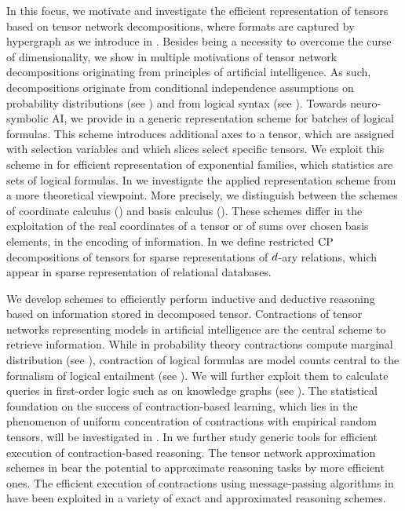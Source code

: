 \subsect{\focusonespec}
In this focus, we motivate and investigate the efficient representation of tensors based on tensor network decompositions, where formats are captured by hypergraph as we introduce in .
Besides being a necessity to overcome the curse of dimensionality, we show in  multiple motivations of tensor network decompositions originating from principles of artificial intelligence.
As such, decompositions originate from conditional independence assumptions on probability distributions (see ) and from logical syntax (see ).
Towards neuro-symbolic AI, we provide in  a generic representation scheme for batches of logical formulas.
This scheme introduces additional axes to a tensor, which are assigned with selection variables and which slices select specific tensors.
We exploit this scheme in  for efficient representation of exponential families, which statistics are sets of logical formulas.
In  we investigate the applied representation scheme from a more theoretical viewpoint.
More precisely, we distinguish between the schemes of coordinate calculus () and basis calculus ().
These schemes differ in the exploitation of the real coordinates of a tensor or of sums over chosen basis elements, in the encoding of information.
In  we define restricted $\mathrm{CP}$ decompositions of tensors for sparse representations of $d$-ary relations, which appear in sparse representation of relational databases.

\subsect{\focustwospec}
We develop schemes to efficiently perform inductive and deductive reasoning based on information stored in decomposed tensor.
Contractions of tensor networks representing models in artificial intelligence are the central scheme to retrieve information.
While in probability theory contractions compute marginal distribution (see ), contraction of logical formulas are model counts central to the formalism of logical entailment (see ).
We will further exploit them to calculate queries in first-order logic such as on knowledge graphs (see ). %
The statistical foundation on the success of contraction-based learning, which lies in the phenomenon of uniform concentration of contractions with empirical random tensors, will be investigated in .
In  we further study generic tools for efficient execution of contraction-based reasoning.
The tensor network approximation schemes in  bear the potential to approximate reasoning tasks by more efficient ones.
The efficient execution of contractions using message-passing algorithms in  have been exploited in a variety of exact and approximated reasoning schemes.